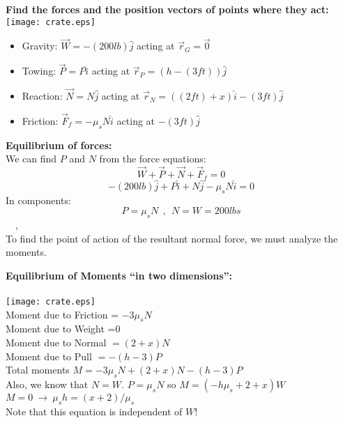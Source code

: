 \documentclass{seminar}
\begin{document}
\begin{slide}

{\bf \blue Find the forces and the position vectors of points where they act:}\\

\texttt{[image: crate.eps]}
\begin{itemize}
\item{}Gravity: $\vec W = -(200lb) \hat j$ acting at $\vec r_G=\vec 0$
\item{}Towing:  $\vec P = P\hat i$ acting at $\vec r_P=(h-(3ft))\hat j$
\item{}Reaction: $\vec N=N\hat j$ acting at $\vec r_N=((2ft)+x)\hat i - (3ft)\hat j$
\item{}Friction:   $\vec F_f = -\mu_s N \hat i$ acting at
$- (3ft)\hat j$
\end{itemize}
 \vfill
\end{slide}










\begin{slide}
{\bf \blue Equilibrium of forces:} \\
We can find $P$ and $N$ from the force equations:
$$\vec W +\vec P  +\vec N+\vec F_f=0$$
$$
  -(200lb) \hat j+ P\hat i  + N\hat j -\mu_s N\hat i=0$$
In components:
$$
P=\mu_sN~~,~~N=W=200lbs
$$
~~,~~\\
To find the point of action of the resultant normal force,
we must analyze the moments.
\vfill
\end{slide}




\begin{slide}
{\bf\blue Equilibrium of Moments ``in two dimensions'':}\\
~~\\
\texttt{[image: crate.eps]}\\
Moment due to Friction = $-3\mu_sN$\\
Moment due to Weight =0\\
Moment due to Normal $= (2+x)N$\\
Moment due to Pull $= -(h-3)P$\\
Total moments $M=-3\mu_sN+(2+x)N-(h-3)P$\\
Also, we know that $N=W$. $P=\mu_sN$ so $M=(-h\mu_s+2+x)W$\\
$M=0~\to~\mu_s h=(x+2)/\mu_s$\\
Note that this equation is independent of $W$!
\vfill
\end{slide} 
\end{document}
